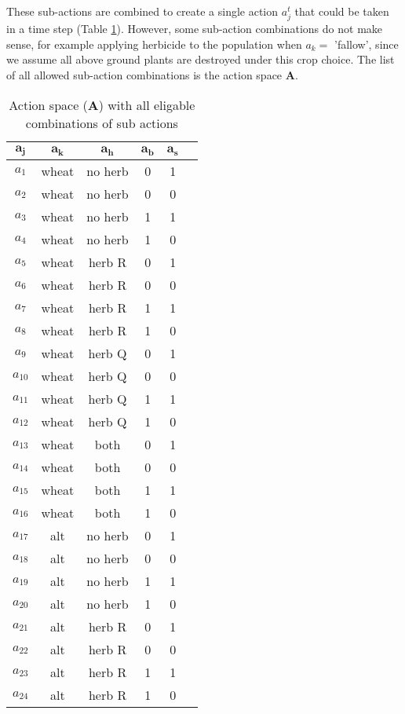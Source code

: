 \documentclass[12pt, a4paper]{article}
\begin{document}
These sub-actions are combined to create a single action $a_j^t$ that could be taken in a time step (Table \ref{table:action_space}). However, some sub-action combinations do not make sense, for example applying herbicide to the population when $a_k =$ 'fallow', since we assume all above ground plants are destroyed under this crop choice. The list of all allowed sub-action combinations is the action space $\mathbf{A}$.   

\begin{longtable}[h]{c c c c c c}
\caption{Action space ($\mathbf{A}$) with all eligable combinations of sub actions\label{table:action_space}}\\
	\hline
	$\mathbf{a_j}$ & $\mathbf{a_k}$ & $\mathbf{a_h}$ & $\mathbf{a_b}$ & $\mathbf{a_s}$\\
	\hline
	$a_1$ & wheat & no herb & 0 & 1\\
	$a_2$ & wheat & no herb & 0 & 0\\
	$a_3$ & wheat & no herb & 1 & 1\\
	$a_4$ & wheat & no herb & 1 & 0\\
	$a_5$ & wheat & herb R & 0 & 1\\
	$a_6$ & wheat & herb R & 0 & 0\\
	$a_7$ & wheat & herb R & 1 & 1\\
	$a_8$ & wheat & herb R & 1 & 0\\
	$a_9$ & wheat & herb Q & 0 & 1\\
	$a_{10}$ & wheat & herb Q & 0 & 0\\
	$a_{11}$ & wheat & herb Q & 1 & 1\\
	$a_{12}$ & wheat & herb Q & 1 & 0\\
	$a_{13}$ & wheat & both & 0 & 1\\
	$a_{14}$ & wheat & both & 0 & 0\\
	$a_{15}$ & wheat & both & 1 & 1\\
	$a_{16}$ & wheat & both & 1 & 0\\
	$a_{17}$ & alt & no herb & 0 & 1\\
	$a_{18}$ & alt & no herb & 0 & 0\\
	$a_{19}$ & alt & no herb & 1 & 1\\
	$a_{20}$ & alt & no herb & 1 & 0\\
	$a_{21}$ & alt & herb R & 0 & 1\\
	$a_{22}$ & alt & herb R & 0 & 0\\
	$a_{23}$ & alt & herb R & 1 & 1\\
	$a_{24}$ & alt & herb R & 1 & 0\\

\end{longtable}
\end{document}
